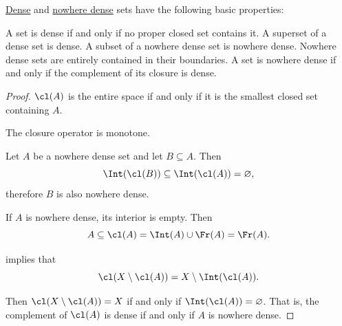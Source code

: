 \begin{proposition}\label{thm:def:topologically_dense_set}
  \hyperref[def:topologically_dense_set]{Dense} and \hyperref[def:topologically_dense_set]{nowhere dense} sets have the following basic properties:
  \begin{thmenum}
     A set is dense if and only if no proper closed set contains it.
     A superset of a dense set is dense.
     A subset of a nowhere dense set is nowhere dense.
     Nowhere dense sets are entirely contained in their boundaries.
     A set is nowhere dense if and only if the complement of its closure is dense.
  \end{thmenum}
\end{proposition}
\begin{proof}
   \( \cl(A) \) is the entire space if and only if it is the smallest closed set containing \( A \).

   The closure operator is monotone.

   Let \( A \) be a nowhere dense set and let \( B \subseteq A \). Then
  \begin{equation*}
    \Int(\cl(B))
    \subseteq
    \Int(\cl(A))
    =
    \varnothing,
  \end{equation*}
  therefore \( B \) is also nowhere dense.

   If \( A \) is nowhere dense, its interior is empty. Then
  \begin{equation*}
    A \subseteq \cl(A) = \Int(A) \cup \Fr(A) = \Fr(A).
  \end{equation*}

    implies that
  \begin{equation*}
    \cl(X \setminus \cl(A)) = X \setminus \Int(\cl(A)).
  \end{equation*}

  Then \( \cl(X \setminus \cl(A)) = X \) if and only if \( \Int(\cl(A)) = \varnothing \). That is, the complement of \( \cl(A) \) is dense if and only if \( A \) is nowhere dense.
\end{proof}

